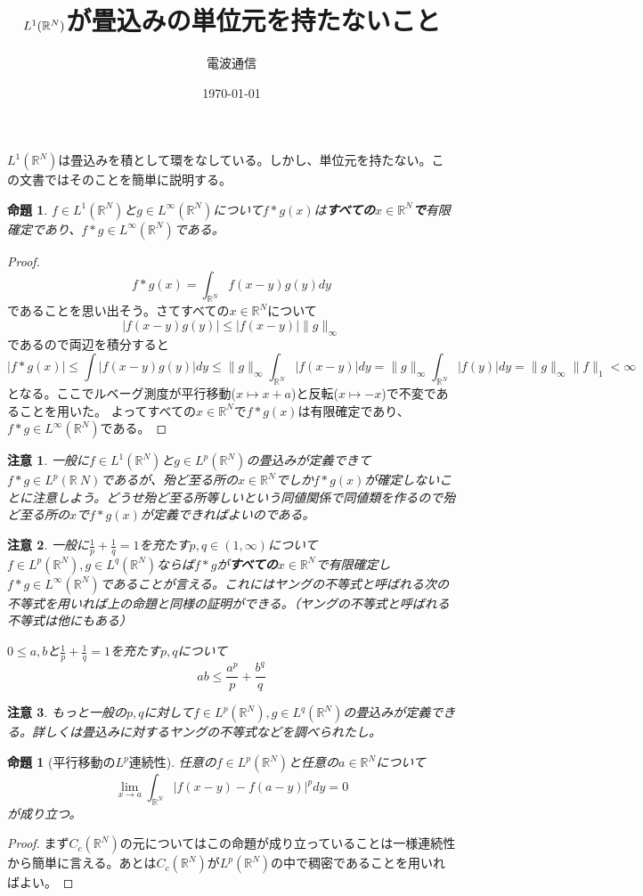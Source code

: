 \documentclass[leqno]{jsarticle}
\title{$L^1(\rr^N)$が畳込みの単位元を持たないこと}
\author{電波通信}
\date{\today}
\newtheorem{prop}[thm]{命題}
\newtheorem*{cau}{注意}
\newcommand{\rr}{\mathbb{R}}
\newcommand{\mgn}{\infty}
\newcommand{\dpst}{\displaystyle}
\begin{document}
\maketitle
$L^1(\rr^N)$は畳込みを積として環をなしている。しかし、単位元を持たない。この文書ではそのことを簡単に説明する。

\begin{prop}\label{1}
$f\in L^1(\rr^N)$と$g\in L^{\mgn}(\rr^N)$について$f*g(x)$は\textbf{すべての$x\in \rr^N$で}有限確定であり、$f*g\in L^{\mgn}(\rr^N)$である。
\end{prop}
\begin{proof}
\[
f*g(x)=\int_{\rr^N}f(x-y)g(y)dy
\]
であることを思い出そう。さてすべての$x\in \rr^N$について
\[
|f(x-y)g(y)|\le |f(x-y)|\|g\|_{\mgn}
\]
であるので両辺を積分すると
\[
|f*g(x)|\le\int|f(x-y)g(y)|dy\le \|g\|_{\mgn}\int_{\rr^N}|f(x-y)|dy=\|g\|_{\mgn}\int_{\rr^N}|f(y)|dy=\|g\|_{\mgn}\|f\|_{1}<\mgn
\]
となる。ここでルベーグ測度が平行移動($x\mapsto x+a$)と反転($x\mapsto -x$)で不変であることを用いた。
よってすべての$x\in \rr^N$で$f*g(x)$は有限確定であり、$f*g\in L^{\mgn}(\rr^N)$である。
\end{proof}
\begin{cau}
一般に$f\in L^1(\rr^N)$と$g\in L^p(\rr^N)$の畳込みが定義できて$f*g\in L^p(\rr~N)$であるが、殆ど至る所の$x\in \rr^N$でしか$f*g(x)$が確定しないことに注意しよう。どうせ殆ど至る所等しいという同値関係で同値類を作るので殆ど至る所の$x$で$f*g(x)$が定義できればよいのである。
\end{cau}
\begin{cau}
一般に$\dpst \frac{1}{p}+\frac{1}{q}=1$を充たす$p,q\in (1,\infty)$について$f\in L^p(\rr^N),g\in L^q(\rr^N)$ならば$f*g$が\textbf{すべての$x\in\rr^N$}で有限確定し$f*g\in L^{\mgn}(\rr^N)$であることが言える。これにはヤングの不等式と呼ばれる次の不等式を用いれば上の命題と同様の証明ができる。（ヤングの不等式と呼ばれる不等式は他にもある）\par
$0\le a,b$と$\dpst \frac{1}{p}+\frac{1}{q}=1$を充たす$p,q$について
\[
ab\le \frac{a^p}{p}+\frac{b^q}{q}
\]
\end{cau}
\begin{cau}
もっと一般の$p,q$に対して$f\in L^p(\rr^N),g\in L^q(\rr^N)$の畳込みが定義できる。詳しくは畳込みに対するヤングの不等式などを調べられたし。
\end{cau}
\begin{prop}[平行移動の$L^p$連続性]\label{2}
任意の$f\in L^p(\rr^N)$と任意の$a\in\rr^N$について
\[
\lim_{x\to a}\int_{\rr^N}|f(x-y)-f(a-y)|^pdy=0
\]
が成り立つ。
\end{prop}
\begin{proof}
まず$C_c(\rr^N)$の元についてはこの命題が成り立っていることは一様連続性から簡単に言える。あとは$C_c(\rr^N)$が$L^p(\rr^N)$の中で稠密であることを用いればよい。
\end{proof}
\end{document}
